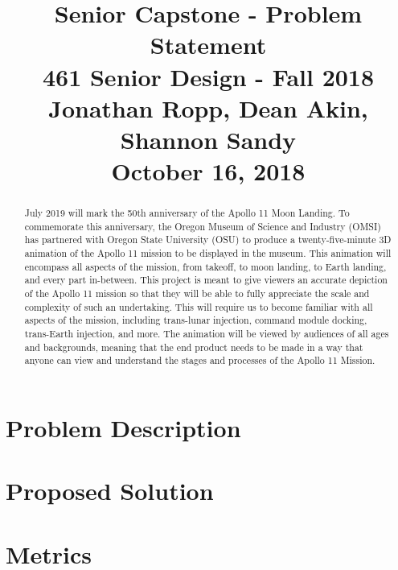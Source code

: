 \documentclass[onecolumn, draftclsnofoot,10pt, compsoc]{IEEEtran}
\begin{document}
\title{Senior Capstone - Problem Statement\\
	\large 461 Senior Design - Fall 2018\\
	\large Jonathan Ropp, Dean Akin, Shannon Sandy\\
	\large October 16, 2018}

\maketitle

\begin{abstract}

July 2019 will mark the 50th anniversary of the Apollo 11 Moon Landing. To commemorate this anniversary, the Oregon Museum of Science and Industry (OMSI) has partnered with Oregon State University (OSU) to produce a twenty-five-minute 3D animation of the Apollo 11 mission to be displayed in the museum. This animation will encompass all aspects of the mission, from takeoff, to moon landing, to Earth landing, and every part in-between. This project is meant to give viewers an accurate depiction of the Apollo 11 mission so that they will be able to fully appreciate the scale and complexity of such an undertaking. This will require us to become familiar with all aspects of the mission, including trans-lunar injection, command module docking, trans-Earth injection, and more. The animation will be viewed by audiences of all ages and backgrounds, meaning that the end product needs to be made in a way that anyone can view and understand the stages and processes of the Apollo 11 Mission.

\end{abstract}

\section{Problem Description}


\section{Proposed Solution}


\section{Metrics}
\end{document}
